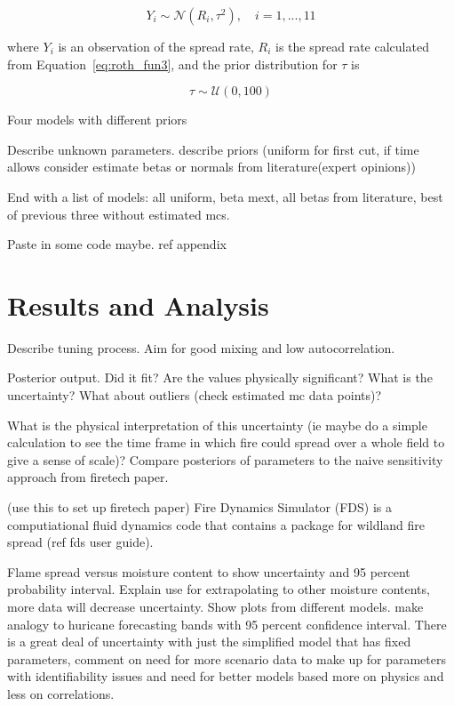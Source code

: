 \documentclass[11pt]{article}
\begin{document}
\begin{equation}
Y_i \sim \mathcal{N}(R_i,\tau^2),\quad i = 1,...,11
\label{eq:like}
\end{equation}

\noindent where $Y_i$ is an observation of the spread rate, $R_i$ is the spread rate calculated from Equation~\ref{eq:roth_fun3}, and the prior distribution for $\tau$ is

\begin{equation}
\tau \sim \mathcal{U}(0,100)
\label{eq:tau_prior}
\end{equation}

Four models with different priors

Describe unknown parameters. describe priors (uniform for first cut, if time allows consider estimate betas or normals from literature(expert opinions))

End with a list of models: all uniform, beta mext, all betas from literature, best of previous three without estimated mcs.

Paste in some code maybe. ref appendix


\section{Results and Analysis}

Describe tuning process. Aim for good mixing and low autocorrelation.

Posterior output. Did it fit? Are the values physically significant? What is the uncertainty? What about outliers (check estimated mc data points)? 

What is the physical interpretation of this uncertainty (ie maybe do a simple calculation to see the time frame in which fire could spread over a whole field to give a sense of scale)? Compare posteriors of parameters to the naive sensitivity approach from firetech paper. 

(use this to set up firetech paper) Fire Dynamics Simulator (FDS) is a computiational fluid dynamics code that contains a package for wildland fire spread (ref fds user guide).

Flame spread versus moisture content to show uncertainty and 95 percent probability interval. Explain use for extrapolating to other moisture contents, more data will decrease uncertainty. Show plots from different models. make analogy to huricane forecasting bands with 95 percent confidence interval. There is a great deal of uncertainty with just the simplified model that has fixed parameters, comment on need for more scenario data to make up for parameters with identifiability issues and need for better models based more on physics and less on correlations.
\end{document}
